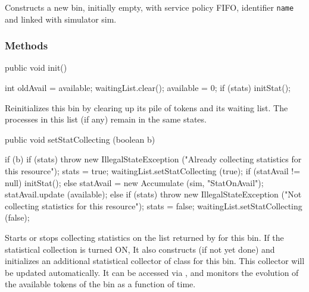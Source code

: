  \begin{tabb}  Constructs a new bin, initially empty, with
   service policy FIFO, identifier \texttt{name} and linked with simulator sim.
 \end{tabb}
\begin{htmlonly}
\end{htmlonly}


\subsubsection* {Methods}
\begin{code}

   public void init() \begin{hide} {
      int oldAvail = available;
      waitingList.clear();
      available = 0;
      if (stats) initStat();
   }\end{hide}
\end{code}
 \begin{tabb}  Reinitializes this bin by clearing up its pile of tokens and
   its waiting list.
   The processes in this list (if any) remain in the same states.
 \end{tabb}
\begin{code}

   public void setStatCollecting (boolean b) \begin{hide} {
      if (b) {
         if (stats)
            throw new IllegalStateException ("Already collecting statistics for this resource");
         stats = true;
         waitingList.setStatCollecting (true);
         if (statAvail != null)
            initStat();
         else {
            statAvail = new Accumulate (sim, "StatOnAvail");
            statAvail.update (available);
         }
      }
      else {
         if (stats)
            throw new IllegalStateException ("Not collecting statistics for this resource");
         stats = false;
         waitingList.setStatCollecting (false);
      }
   }\end{hide}
\end{code}
 \begin{tabb}  Starts or stops collecting statistics on the list returned
  by  for this bin.
  If the statistical collection is turned ON, It also constructs (if not yet done)
  and initializes an additional statistical
  collector of class
  for this bin.  This collector will be updated
  automatically.  It can be accessed via , and
   monitors the evolution of the
  available tokens of the bin
  as a function of time.
 \end{tabb}
